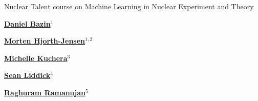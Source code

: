 \documentclass[%
oneside,                 %
final,                   %
10pt]{article}
\begin{document}

\newcommand{\exercisesection}[1]{\subsection*{#1}}






\thispagestyle{empty}

\begin{center}
{\LARGE\bf
\begin{spacing}{1.25}
Nuclear Talent course  on Machine Learning in Nuclear Experiment and Theory
\end{spacing}
}
\end{center}


\begin{center}
{\bf \href{{https://www.nscl.msu.edu/directory/bazin.html}}{Daniel Bazin}${}^{1}$} \\ [0mm]
\end{center}


\begin{center}
{\bf \href{{http://mhjgit.github.io/info/doc/web/}}{Morten Hjorth-Jensen}${}^{1, 2}$} \\ [0mm]
\end{center}


\begin{center}
{\bf \href{{https://www.davidson.edu/academics/physics/faculty-and-staff/michelle-kuchera}}{Michelle Kuchera}${}^{3}$} \\ [0mm]
\end{center}


\begin{center}
{\bf \href{{https://www.nscl.msu.edu/directory/liddick.html}}{Sean Liddick}${}^{4}$} \\ [0mm]
\end{center}


\begin{center}
{\bf \href{{https://www.davidson.edu/academics/mathematics-and-computer-science/faculty-and-staff/raghuram-ramanujan}}{Raghuram Ramanujan}${}^{5}$} \\ [0mm]
\end{center}
\end{document}
